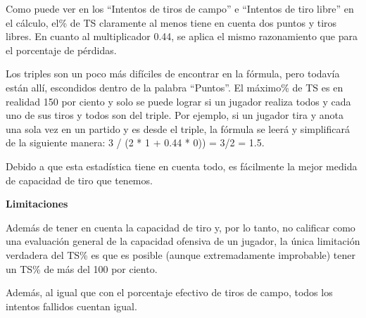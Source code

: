 \documentclass[
]{article}
\newenvironment{Shaded}{\begin{snugshade}}{\end{snugshade}}
\newcommand{\DecValTok}[1]{\textcolor[rgb]{0.00,0.00,0.81}{#1}}
\newcommand{\FloatTok}[1]{\textcolor[rgb]{0.00,0.00,0.81}{#1}}
\newcommand{\KeywordTok}[1]{\textcolor[rgb]{0.13,0.29,0.53}{\textbf{#1}}}
\newcommand{\NormalTok}[1]{#1}
\newcommand{\OperatorTok}[1]{\textcolor[rgb]{0.81,0.36,0.00}{\textbf{#1}}}
\newcommand{\StringTok}[1]{\textcolor[rgb]{0.31,0.60,0.02}{#1}}
\begin{document}
Como puede ver en los ``Intentos de tiros de campo'' e ``Intentos de
tiro libre'' en el cálculo, el\% de TS claramente al menos tiene en
cuenta dos puntos y tiros libres. En cuanto al multiplicador 0.44, se
aplica el mismo razonamiento que para el porcentaje de pérdidas.

Los triples son un poco más difíciles de encontrar en la fórmula, pero
todavía están allí, escondidos dentro de la palabra ``Puntos''. El
máximo\% de TS es en realidad 150 por ciento y solo se puede lograr si
un jugador realiza todos y cada uno de sus tiros y todos son del triple.
Por ejemplo, si un jugador tira y anota una sola vez en un partido y es
desde el triple, la fórmula se leerá y simplificará de la siguiente
manera: 3 / (2 * 1 + 0.44 * 0)) = 3/2 = 1.5.

Debido a que esta estadística tiene en cuenta todo, es fácilmente la
mejor medida de capacidad de tiro que tenemos.

\textbf{Limitaciones}

Además de tener en cuenta la capacidad de tiro y, por lo tanto, no
calificar como una evaluación general de la capacidad ofensiva de un
jugador, la única limitación verdadera del TS\% es que es posible
(aunque extremadamente improbable) tener un TS\% de más del 100 por
ciento.

Además, al igual que con el porcentaje efectivo de tiros de campo, todos
los intentos fallidos cuentan igual.

\begin{Shaded}
\end{Shaded}
\end{document}
